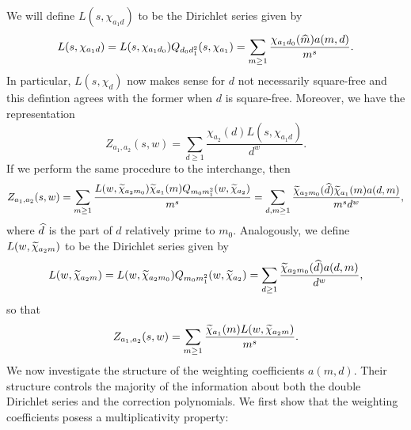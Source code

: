 \documentclass[12pt,reqno,oneside]{amsart}
\begin{document}
    We will define $L(s,\chi_{a_{1}d})$ to be the Dirichlet series given by
    \[
        L(s,\chi_{a_{1}d}) = L(s,\chi_{a_{1}d_{0}})Q_{d_{0}d_{1}^{2}}(s,\chi_{a_{1}}) = \sum_{m \ge 1}\frac{\chi_{a_{1}d_{0}}(\widehat{m})a(m,d)}{m^{s}}.
    \]
    In particular, $L(s,\chi_{d})$ now makes sense for $d$ not necessarily square-free and this defintion agrees with the former when $d$ is square-free. Moreover, we have the representation
    \[
        Z_{a_{1},a_{2}}(s,w) = \sum_{d \ge 1}\frac{\chi_{a_{2}}(d)L(s,\chi_{a_{1}d})}{d^{w}}.
    \]
    If we perform the same procedure to the interchange, then
    \[
        Z_{a_{1},a_{2}}(s,w) = \sum_{m \ge 1}\frac{L(w,\widetilde{\chi}_{a_{2}m_{0}})\widetilde{\chi}_{a_{1}}(m)Q_{m_{0}m_{1}^{2}}(w,\widetilde{\chi}_{a_{2}})}{m^{s}} = \sum_{d,m \ge 1}\frac{\widetilde{\chi}_{a_{2}m_{0}}(\widehat{d})\widetilde{\chi}_{a_{1}}(m)a(d,m)}{m^{s}d^{w}},
    \]
    where $\widehat{d}$ is the part of $d$ relatively prime to $m_{0}$. Analogously, we define $L(w,\widetilde{\chi}_{a_{2}m})$ to be the Dirichlet series given by
    \[
        L(w,\widetilde{\chi}_{a_{2}m}) = L(w,\widetilde{\chi}_{a_{2}m_{0}})Q_{m_{0}m_{1}^{2}}(w,\widetilde{\chi}_{a_{2}}) = \sum_{d \ge 1}\frac{\widetilde{\chi}_{a_{2}m_{0}}(\widehat{d})a(d,m)}{d^{w}},
    \]
    so that
    \[
        Z_{a_{1},a_{2}}(s,w) = \sum_{m \ge 1}\frac{\widetilde{\chi}_{a_{1}}(m)L(w,\widetilde{\chi}_{a_{2}m})}{m^{s}}.
    \]
    We now investigate the structure of the weighting coefficients $a(m,d)$. Their structure controls the majority of the information about both the double Dirichlet series and the correction polynomials. We first show that the weighting coefficients posess a multiplicativity property:
\end{document}
